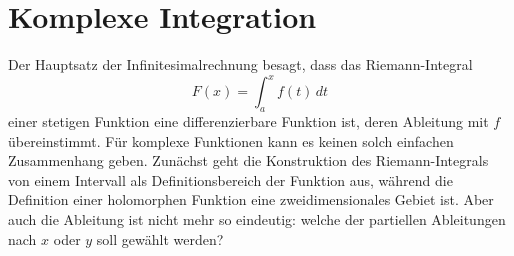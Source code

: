 %
%
%
\chapter{Komplexe Integration
\label{chapter:integration}}

\noindent
Der Hauptsatz der Infinitesimalrechnung besagt, dass das Riemann-Integral
\[
F(x)
=
\int_{a}^x f(t)\,dt
\]
einer stetigen Funktion eine differenzierbare Funktion ist, deren 
Ableitung mit $f$ übereinstimmt.
Für komplexe Funktionen kann es keinen solch einfachen Zusammenhang
geben.
Zunächst geht die Konstruktion des Riemann-Integrals von einem Intervall
als Definitionsbereich der Funktion aus, während die Definition einer
holomorphen Funktion eine zweidimensionales Gebiet ist.
Aber auch die Ableitung ist nicht mehr so eindeutig: welche der
partiellen Ableitungen nach $x$ oder $y$ soll gewählt werden?







\uebungsabschnitt

\begin{uebungsaufgaben}
\end{uebungsaufgaben}
\enduebungsabschnitt

